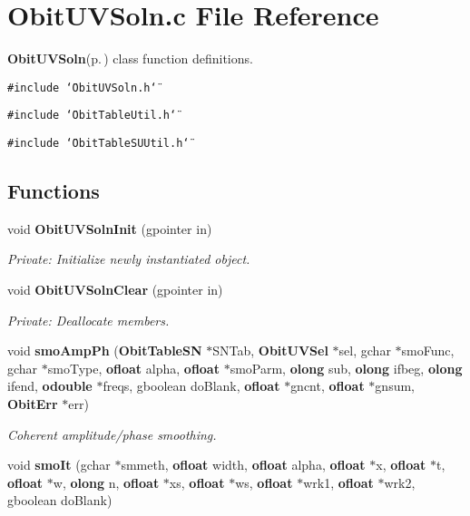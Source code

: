 \section{Obit\-UVSoln.c File Reference}
\label{ObitUVSoln_8c}
{\bf Obit\-UVSoln}{\rm (p.\,\pageref{structObitUVSoln})} class function definitions. 

{\tt \#include \char`\"{}Obit\-UVSoln.h\char`\"{}}\par
{\tt \#include \char`\"{}Obit\-Table\-Util.h\char`\"{}}\par
{\tt \#include \char`\"{}Obit\-Table\-SUUtil.h\char`\"{}}\par
\subsection*{Functions}
\begin{CompactItemize}
\item 
void {\bf Obit\-UVSoln\-Init} (gpointer in)
\begin{CompactList}\small\item\em Private: Initialize newly instantiated object. \item\end{CompactList}\item 
void {\bf Obit\-UVSoln\-Clear} (gpointer in)
\begin{CompactList}\small\item\em Private: Deallocate members. \item\end{CompactList}\item 
void {\bf smo\-Amp\-Ph} ({\bf Obit\-Table\-SN} $\ast$SNTab, {\bf Obit\-UVSel} $\ast$sel, gchar $\ast$smo\-Func, gchar $\ast$smo\-Type, {\bf ofloat} alpha, {\bf ofloat} $\ast$smo\-Parm, {\bf olong} sub, {\bf olong} ifbeg, {\bf olong} ifend, {\bf odouble} $\ast$freqs, gboolean do\-Blank, {\bf ofloat} $\ast$gncnt, {\bf ofloat} $\ast$gnsum, {\bf Obit\-Err} $\ast$err)
\begin{CompactList}\small\item\em Coherent amplitude/phase smoothing. \item\end{CompactList}\item 
void {\bf smo\-It} (gchar $\ast$smmeth, {\bf ofloat} width, {\bf ofloat} alpha, {\bf ofloat} $\ast$x, {\bf ofloat} $\ast$t, {\bf ofloat} $\ast$w, {\bf olong} n, {\bf ofloat} $\ast$xs, {\bf ofloat} $\ast$ws, {\bf ofloat} $\ast$wrk1, {\bf ofloat} $\ast$wrk2, gboolean do\-Blank)

\end{CompactItemize}
